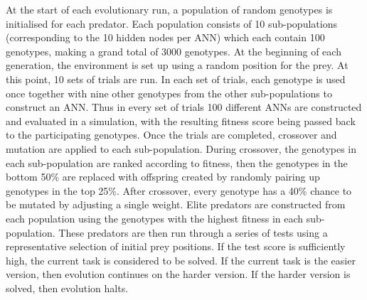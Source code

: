 \documentclass[12pt]{article} %
\begin{document}
At the start of each evolutionary run, a population of random genotypes is initialised for each predator. Each population consists of 10 sub-populations (corresponding to the 10 hidden nodes per ANN) which each contain 100 genotypes, making a grand total of 3000 genotypes. At the beginning of each generation, the environment is set up using a random position for the prey. At this point, 10 sets of trials are run. In each set of trials, each genotype is used once together with nine other genotypes from the other sub-populations to construct an ANN. Thus in every set of trials 100 different ANNs are constructed and evaluated in a simulation, with the resulting fitness score being passed back to the participating genotypes. Once the trials are completed, crossover and mutation are applied to each sub-population. During crossover, the genotypes in each sub-population are ranked according to fitness, then the genotypes in the bottom 50\% are replaced with offspring created by randomly pairing up genotypes in the top 25\%. After crossover, every genotype has a 40\% chance to be mutated by adjusting a single weight. Elite predators are constructed from each population using the genotypes with the highest fitness in each sub-population. These predators are then run through a series of tests using a representative selection of initial prey positions. If the test score is sufficiently high, the current task is considered to be solved. If the current task is the easier version, then evolution continues on the harder version. If the harder version is solved, then evolution halts.
\end{document}
